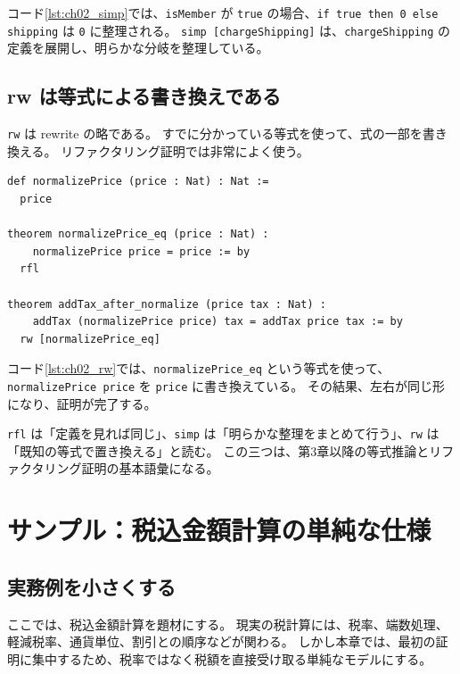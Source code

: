 コード\ref{lst:ch02_simp}では、\texttt{isMember} が \texttt{true} の場合、\texttt{if true then 0 else shipping} は \texttt{0} に整理される。
\texttt{simp [chargeShipping]} は、\texttt{chargeShipping} の定義を展開し、明らかな分岐を整理している。

\subsection{rw は等式による書き換えである}

\texttt{rw} は rewrite の略である。
すでに分かっている等式を使って、式の一部を書き換える。
リファクタリング証明では非常によく使う。

\begin{listing}[htbp]
\begin{verbatim}
def normalizePrice (price : Nat) : Nat :=
  price

theorem normalizePrice_eq (price : Nat) :
    normalizePrice price = price := by
  rfl

theorem addTax_after_normalize (price tax : Nat) :
    addTax (normalizePrice price) tax = addTax price tax := by
  rw [normalizePrice_eq]
\end{verbatim}
\caption{rw で既知の等式を使って書き換える}
\label{lst:ch02_rw}
\end{listing}

コード\ref{lst:ch02_rw}では、\texttt{normalizePrice\_eq} という等式を使って、\texttt{normalizePrice price} を \texttt{price} に書き換えている。
その結果、左右が同じ形になり、証明が完了する。

\begin{leanbox}
\texttt{rfl} は「定義を見れば同じ」、\texttt{simp} は「明らかな整理をまとめて行う」、\texttt{rw} は「既知の等式で置き換える」と読む。
この三つは、第3章以降の等式推論とリファクタリング証明の基本語彙になる。
\end{leanbox}

\section{サンプル：税込金額計算の単純な仕様}

\subsection{実務例を小さくする}

ここでは、税込金額計算を題材にする。
現実の税計算には、税率、端数処理、軽減税率、通貨単位、割引との順序などが関わる。
しかし本章では、最初の証明に集中するため、税率ではなく税額を直接受け取る単純なモデルにする。


